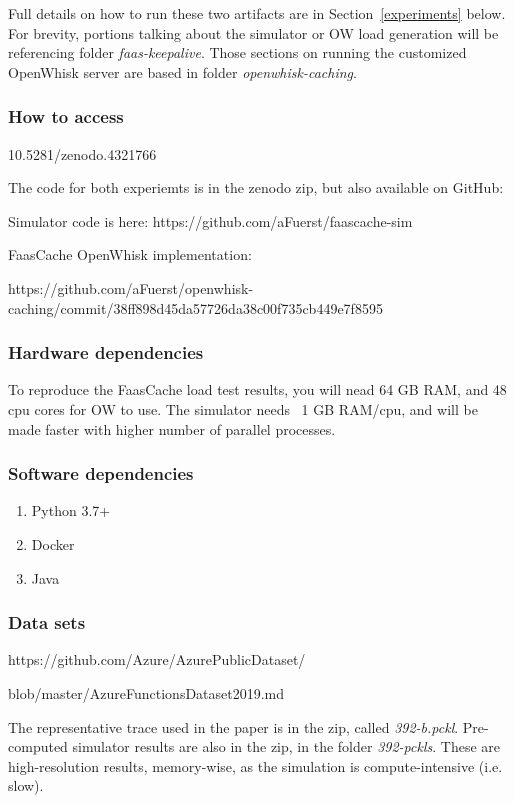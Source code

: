 {Full details on how to run these two artifacts are in Section~\ref{experiments} below.
For brevity, portions talking about the simulator or OW load generation will be referencing folder {\em faas-keepalive}.
Those sections on running the customized OpenWhisk server are based in folder {\em openwhisk-caching}.

\subsubsection{How to access}

10.5281/zenodo.4321766

The code for both experiemts is in the zenodo zip, but also available on GitHub:

Simulator code is here:
https://github.com/aFuerst/faascache-sim

FaasCache OpenWhisk implementation:

https://github.com/aFuerst/openwhisk-caching/commit/38ff898d45da57726da38c00f735cb449e7f8595


\subsubsection{Hardware dependencies}

To reproduce the FaasCache load test results, you will nead 64 GB RAM, and 48 cpu cores for OW to use.
The simulator needs ~1 GB RAM/cpu, and will be made faster with higher number of parallel processes.


\subsubsection{Software dependencies}

\begin{enumerate}
  \item Python 3.7+
  \item Docker
  \item Java
\end{enumerate}


\subsubsection{Data sets} \label{data-sets}

https://github.com/Azure/AzurePublicDataset/

blob/master/AzureFunctionsDataset2019.md

The representative trace used in the paper is in the zip, called {\em 392-b.pckl}.
Pre-computed simulator results are also in the zip, in the folder {\em 392-pckls}. 
These are high-resolution results, memory-wise, as the simulation is compute-intensive (i.e. slow).

}
